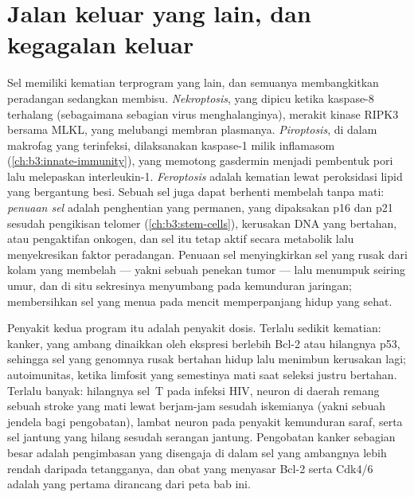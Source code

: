 \section{Jalan keluar yang lain, dan kegagalan keluar}

\begin{definition}\label{def:b3:cell-cycle-apoptosis:other}
Sel memiliki kematian terprogram yang lain, dan semuanya membangkitkan
peradangan sedangkan  membisu. \emph{Nekroptosis}, yang dipicu
 ketika kaspase-8 terhalang (sebagaimana sebagian virus
menghalanginya), merakit kinase RIPK3 bersama MLKL, yang melubangi membran
plasmanya. \emph{Piroptosis}, di dalam makrofag yang terinfeksi, dilaksanakan
kaspase-1 milik inflamasom (\cref{ch:b3:innate-immunity}), yang memotong
gasdermin menjadi pembentuk pori lalu melepaskan interleukin-1.
\emph{Feroptosis} adalah kematian lewat peroksidasi lipid yang bergantung
besi. Sebuah sel juga dapat berhenti membelah tanpa mati: \emph{penuaan sel}
adalah penghentian yang permanen, yang dipaksakan p16 dan p21 sesudah
pengikisan telomer (\cref{ch:b3:stem-cells}), kerusakan DNA yang bertahan,
atau pengaktifan onkogen, dan sel itu tetap aktif secara metabolik lalu
menyekresikan faktor peradangan. Penuaan sel menyingkirkan sel yang rusak dari
kolam yang membelah --- yakni sebuah penekan tumor --- lalu menumpuk seiring
umur, dan di situ sekresinya menyumbang pada kemunduran jaringan; membersihkan
sel yang menua pada mencit memperpanjang hidup yang sehat.
\end{definition}

\begin{remark}\label{rem:b3:cell-cycle-apoptosis:disease}
Penyakit kedua program itu adalah penyakit dosis. Terlalu sedikit kematian:
kanker, yang ambang  dinaikkan oleh ekspresi berlebih Bcl-2 atau
hilangnya p53, sehingga sel yang genomnya rusak bertahan hidup lalu menimbun
kerusakan lagi; autoimunitas, ketika limfosit yang semestinya mati saat
seleksi justru bertahan. Terlalu banyak: hilangnya sel~T pada infeksi HIV,
neuron di daerah remang sebuah stroke yang mati lewat  berjam-jam
sesudah iskemianya (yakni sebuah jendela bagi pengobatan),  lambat
neuron pada penyakit kemunduran saraf, serta sel jantung yang hilang sesudah
serangan jantung. Pengobatan kanker sebagian besar adalah pengimbasan
 yang disengaja di dalam sel yang ambangnya lebih rendah daripada
tetangganya, dan obat yang menyasar Bcl-2 serta Cdk4/6 adalah yang pertama
dirancang dari peta bab ini.
\end{remark}

